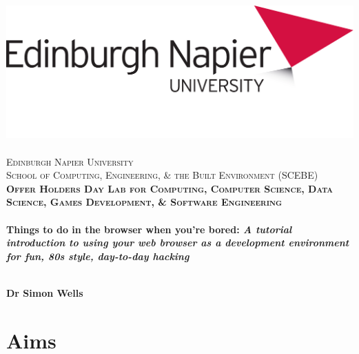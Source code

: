 \documentclass[10pt, a4paper, oneside]{article}
\begin{document}

\begin{titlepage}
\vspace*{5cm}
\begin{center}
\includegraphics[width=.5\textwidth]{images/EdNapUniLogoCMYK.pdf}~\\[1cm]

\textsc{\Large Edinburgh Napier University\\School of Computing, Engineering, \& the Built Environment (SCEBE)}\\[1.5cm]

\textsc{\LARGE \bfseries Offer Holders Day Lab for Computing, Computer Science, Data Science, Games Development, \& Software Engineering}\\[0.5cm]

\hrulefill \\[0.4cm]
{\huge \bfseries Things to do in the browser when you're bored: {\emph{A tutorial introduction to using your web browser as a development environment for fun, 80s style, day-to-day hacking}} \\[0.4cm] }
\hrulefill \\[1.5cm]

\begin{minipage}{0.4\textwidth}
\begin{flushleft} \large
\textbf{Dr Simon Wells} \\
\end{flushleft}
\end{minipage}

\vfill

\end{center}
\end{titlepage}




%

\section{Aims}
\end{document}
